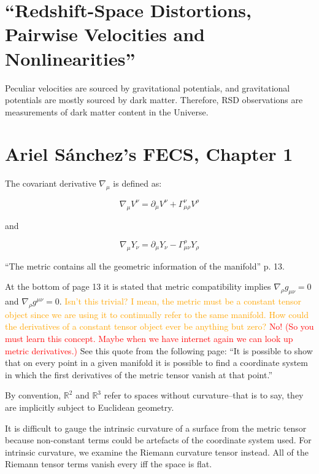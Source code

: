 \documentclass[11pt]{article}
\begin{document}
\section{``Redshift-Space Distortions, Pairwise Velocities and
Nonlinearities''}

Peculiar velocities are sourced by gravitational potentials, and gravitational
potentials are mostly sourced by dark matter. Therefore, RSD observations are
measurements of dark matter content in the Universe.

\section{Ariel S\'{a}nchez's FECS, Chapter 1}

The covariant derivative $\nabla_\mu$ is defined as:

\begin{equation}
	\nabla_\mu V^\nu = \partial_\mu V^\nu + \Gamma^\nu_{\mu \rho} V^\rho
\end{equation}

and

\begin{equation}
	\nabla_\mu Y_\nu = \partial_\mu Y_\nu - \Gamma^\rho_{\mu \nu} Y_\rho
\end{equation}

``The metric contains all the geometric information of the manifold'' p. 13.

At the bottom of page 13 it is stated that metric compatibility implies
$\nabla_\rho g_{\mu \nu} = 0$ and $\nabla_\rho  g^{\mu \nu} = 0$.
\textcolor{orange}{Isn't this trivial? I mean, the metric must be a constant
tensor object since we are using it to continually refer to the same manifold.
How could the derivatives of a constant tensor object ever be anything but
zero?} \textcolor{red}{No! (So you must learn this concept. Maybe when we have
internet again we can look up metric derivatives.)} See this quote from the
following page: ``It is possible to show that on every point in a given
manifold it is possible to find a coordinate system in which the first
derivatives of the metric tensor vanish at that point.''

By convention, $\mathbb{R}^2$ and $\mathbb{R}^3$ refer to spaces without
curvature--that is to say, they are implicitly subject to Euclidean geometry.

It is difficult to gauge the intrinsic curvature of a surface from the metric
tensor because non-constant terms could be artefacts of the coordinate system
used. For intrinsic curvature, we examine the Riemann curvature tensor instead.
All of the Riemann tensor terms vanish every iff the space is flat.
\end{document}
